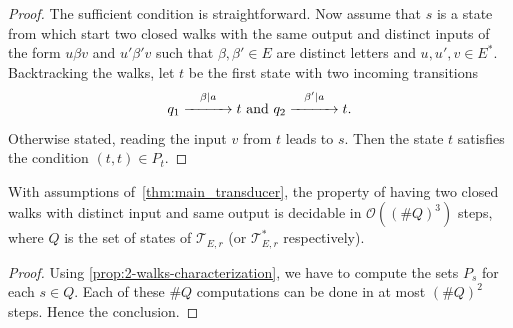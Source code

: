 \documentclass[12pt,reqno]{amsart}
\begin{document}
\begin{proof}
The sufficient condition is straightforward. Now assume that $s$ is a state from which start two closed walks with the same output and distinct inputs of the form $u\beta v$ and $u'\beta'v$ such that $\beta,\beta'\in E$ are distinct letters and $u,u',v\in E^*$. Backtracking the walks, let $t$ be the first state with two incoming transitions 
\[
q_1\stackrel{\beta|a}{\xrightarrow{\hspace{1 cm}}} t \text{ and }q_2\stackrel{\beta'|a}{\xrightarrow{\hspace{1 cm}}} t.
\]
Otherwise stated, reading the input $v$ from $t$ leads to $s$. Then the state $t$ satisfies the condition $(t,t)\in P_t$.
\end{proof}

\begin{corollary}
With assumptions of~\cref{thm:main_transducer}, the property of having two closed walks with distinct input and same output is decidable in $\mathcal{O}((\# Q)^3)$ steps, where $Q$ is the set of states of $\mathcal{T}_{E,r}$ (or $\mathcal{T}^*_{E,r}$ respectively). 
\end{corollary}

\begin{proof}
    Using \cref{prop:2-walks-characterization}, we have to compute the sets $P_s$ for each $s\in Q$. Each of these $\# Q$ computations can be done in at most $(\# Q)^2$ steps. Hence the conclusion.
\end{proof}
\end{document}
